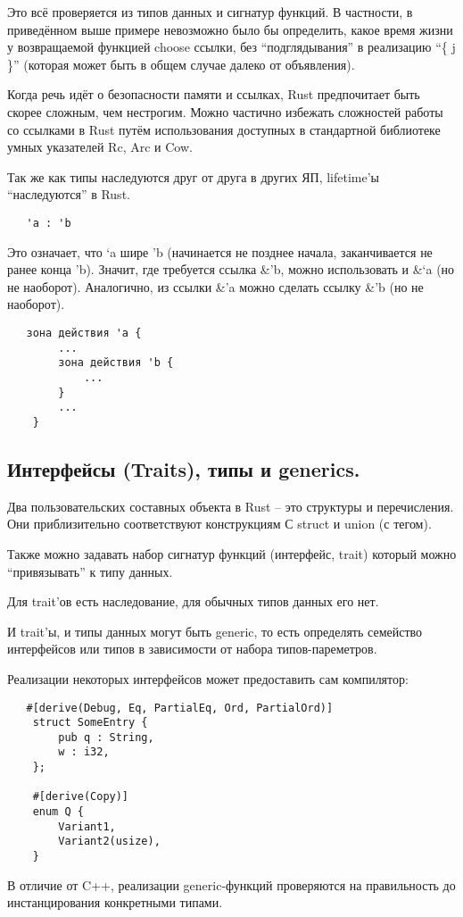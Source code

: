 \documentclass[10pt, a5paper]{article}
\begin{document}
Это всё проверяется из типов данных и сигнатур функций. В частности,
в приведённом выше примере невозможно было бы определить, какое время жизни у возвращаемой функцией choose ссылки, без ``подглядывания'' в реализацию ``\{ j \}'' (которая может быть в общем случае далеко от объявления).

Когда речь идёт о безопасности памяти и ссылках, Rust предпочитает быть скорее сложным, чем нестрогим. Можно частично избежать сложностей работы со ссылками в Rust путём использования доступных в стандартной библиотеке умных указателей Rc, Arc и Cow.

Так же как типы наследуются друг от друга в других ЯП, lifetime'ы ``наследуются'' в Rust.

\begin{verbatim}
   'a : 'b\end{verbatim}
Это означает, что `a шире 'b (начинается не позднее начала, заканчивается не ранее конца 'b). Значит, где требуется ссылка \&'b,
можно использовать и \&`a (но не наоборот). Аналогично, из ссылки \&'a можно сделать ссылку \&'b (но не наоборот).

\begin{verbatim}
   зона действия 'a {
        ...
        зона действия 'b {
            ...
        }
        ...
    }\end{verbatim}
\subsection*{Интерфейсы (Traits), типы и generics.}

Два пользовательских составных объекта в Rust -- это структуры и перечисления. Они приблизительно соответствуют конструкциям С struct и union (с тегом).

Также можно задавать набор сигнатур функций (интерфейс, trait) который можно ``привязывать'' к типу данных.

Для trait'ов есть наследование, для обычных типов данных его нет.

И trait'ы, и типы данных могут быть generic, то есть определять семейство интерфейсов или типов в зависимости от набора типов-пареметров.

Реализации некоторых интерфейсов может предоставить сам компилятор:

\begin{verbatim}
   #[derive(Debug, Eq, PartialEq, Ord, PartialOrd)]
    struct SomeEntry {
        pub q : String,
        w : i32,
    };
    
    #[derive(Copy)]
    enum Q {
        Variant1,
        Variant2(usize),
    }\end{verbatim}
В отличие от C++, реализации generic-функций проверяются на правильность до инстанцирования конкретными типами.
\end{document}
